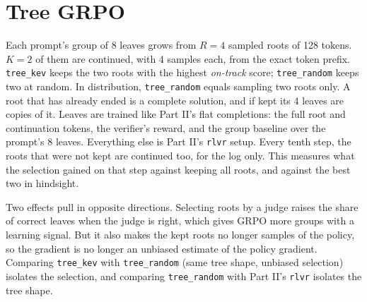 \section{Tree GRPO}\label{sec:tree}

Each prompt's group of 8 leaves grows from $R=4$ sampled roots of 128 tokens. $K=2$ of them are continued, with 4
samples each, from the exact token prefix. \texttt{tree\_kev} keeps the two roots with the highest \kev{}
\emph{on-track} score; \texttt{tree\_random} keeps two at random. In distribution, \texttt{tree\_random} equals sampling
two roots only. A root that has already ended is a complete solution, and if kept its 4 leaves are copies of it. Leaves
are trained like Part II's flat completions: the full root and continuation tokens, the verifier's reward, and the
group baseline over the prompt's 8 leaves. Everything else is Part II's \texttt{rlvr} setup. Every tenth step, the roots
that were not kept are continued too, for the log only. This measures what the selection gained on that step against
keeping all roots, and against the best two in hindsight.

Two effects pull in opposite directions. Selecting roots by a judge raises the share of correct leaves when the judge
is right, which gives GRPO more groups with a learning signal. But it also makes the kept roots no longer samples of the
policy, so the gradient is no longer an unbiased estimate of the policy gradient. Comparing \texttt{tree\_kev} with
\texttt{tree\_random} (same tree shape, unbiased selection) isolates the selection, and comparing \texttt{tree\_random}
with Part II's \texttt{rlvr} isolates the tree shape.
